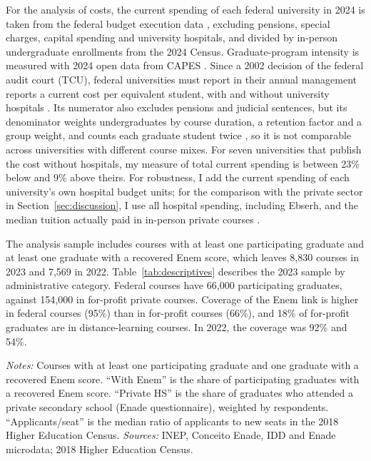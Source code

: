 \documentclass[11pt,a4paper]{article}
\begin{document}
For the analysis of costs, the current spending of each federal university in 2024 is taken from the federal budget execution data \citep{cgu2024}, excluding pensions, special charges, capital spending and university hospitals, and divided by in-person undergraduate enrollments from the 2024 Census. Graduate-program intensity is measured with 2024 open data from CAPES \citep{capes2024}. Since a 2002 decision of the federal audit court (TCU), federal universities must report in their annual management reports a current cost per equivalent student, with and without university hospitals \citep{tcu2002}. Its numerator also excludes pensions and judicial sentences, but its denominator weights undergraduates by course duration, a retention factor and a group weight, and counts each graduate student twice \citep{tcu2010}, so it is not comparable across universities with different course mixes. For seven universities that publish the cost without hospitals, my measure of total current spending is between 23\% below and 9\% above theirs. For robustness, I add the current spending of each university's own hospital budget units; for the comparison with the private sector in Section~\ref{sec:discussion}, I use all hospital spending, including Ebserh, and the median tuition actually paid in in-person private courses \citep{hoper2026}.

The analysis sample includes courses with at least one participating graduate and at least one graduate with a recovered Enem score, which leaves 8,830 courses in 2023 and 7,569 in 2022. Table~\ref{tab:descriptives} describes the 2023 sample by administrative category. Federal courses have 66,000 participating graduates, against 154,000 in for-profit private courses. Coverage of the Enem link is higher in federal courses (95\%) than in for-profit courses (66\%), and 18\% of for-profit graduates are in distance-learning courses. In 2022, the coverage was 92\% and 54\%.

\begin{table}[!htbp]
\centering\footnotesize
\caption{Courses and graduates by administrative category, Enade 2023}\label{tab:descriptives}
\resizebox{\linewidth}{!}{}
\begin{minipage}{\linewidth}\vspace{0.4em}\scriptsize
\textit{Notes:} Courses with at least one participating graduate and one graduate with a recovered Enem score. ``With Enem'' is the share of participating graduates with a recovered Enem score. ``Private HS'' is the share of graduates who attended a private secondary school (Enade questionnaire), weighted by respondents. ``Applicants/seat'' is the median ratio of applicants to new seats in the 2018 Higher Education Census. \textit{Sources:} INEP, Conceito Enade, IDD and Enade microdata; 2018 Higher Education Census.
\end{minipage}
\end{table}
\end{document}

